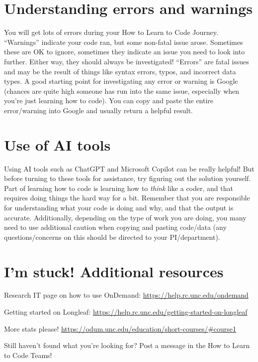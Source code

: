 \documentclass[
  letterpaper,
  DIV=11,
  numbers=noendperiod]{scrreprt}
\begin{document}
\section{Understanding errors and
warnings}\label{understanding-errors-and-warnings}

You will get lots of errors during your How to Learn to Code Journey.
``Warnings'' indicate your code ran, but some non-fatal issue arose.
Sometimes these are OK to ignore, sometimes they indicate an issue you
need to look into further. Either way, they should always be
investigated! ``Errors'' are fatal issues and may be the result of
things like syntax errors, typos, and incorrect data types. A good
starting point for investigating any error or warning is Google (chances
are quite high someone has run into the same issue, especially when
you're just learning how to code). You can copy and paste the entire
error/warning into Google and usually return a helpful result.

\section{Use of AI tools}\label{use-of-ai-tools}

Using AI tools such as ChatGPT and Microsoft Copilot can be really
helpful! But before turning to these tools for assistance, try figuring
out the solution yourself. Part of learning how to code is learning how
to \emph{think} like a coder, and that requires doing things the hard
way for a bit. Remember that you are responsible for understanding what
your code is doing and why, and that the output is accurate.
Additionally, depending on the type of work you are doing, you many need
to use additional caution when copying and pasting code/data (any
questions/concerns on this should be directed to your PI/department).

\section{I'm stuck! Additional
resources}\label{im-stuck-additional-resources}

Research IT page on how to use OnDemand:
\url{https://help.rc.unc.edu/ondemand}

Getting started on Longleaf:
\url{https://help.rc.unc.edu/getting-started-on-longleaf}

More stats please!
\url{https://odum.unc.edu/education/short-courses/\#course1}

Still haven't found what you're looking for? Post a message in the How
to Learn to Code Teams!
\end{document}
